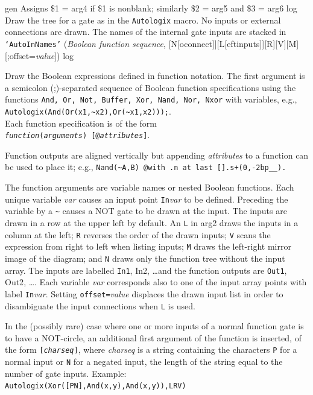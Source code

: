   {gen}%
  {Assigns \$1 = arg4 if \$1 is nonblank; similarly \$2 = arg5 and \$3 = arg6}%
%
  {log}%
  {Draw the tree for a gate as in the {\tt Autologix} macro.  No inputs
   or external connections are drawn.  The names of the internal gate
   inputs are stacked in {\tt `AutoInNames'}}%
%
 {({\sl Boolean function sequence},%
    [N[oconnect]][L[eftinputs]][R][V][M][;offset={\sl value}])}%
  {log}%
  {Draw the Boolean expressions defined in function notation.
   The first argument is a semicolon (;)-separated sequence of
   Boolean function specifications using the functions
   {\tt And, Or, Not, Buffer, Xor, Nand, Nor, Nxor}
   with variables, e.g.,
   {\tt Autologix(And(Or(x1,\~{}x2),Or(\~{}x1,x2)));}.\\
   Each function specification is of the form\\
   {\tt {\sl function}({\sl arguments}) [@{\sl attributes}]}.
   \par
   Function outputs are aligned vertically but appending
   {\tt@}{\sl attributes} to a function can be used to place it; e.g.,
   {\tt Nand(\~{}A,B) @with .n at last [].s+(0,-2bp\_\_).}
   \par
   The function arguments are variable names or nested Boolean functions.
   Each unique variable {\sl var} causes an input point {\tt In}{\sl var}
   to be defined.  Preceding the variable by a {\tt \~{}} causes a NOT gate
   to be drawn at the input.
   The inputs are drawn in a row at the upper left by default.
   An {\tt L} in arg2 draws the inputs in a column at the left;
   {\tt R} reverses the order of the drawn inputs;
   {\tt V} scans the expression from right to left
   when listing inputs;
   {\tt M} draws the left-right mirror image of the diagram;
   and {\tt N} draws only the function tree without the input array.
   The inputs are labelled {\tt In1}, {In2}, \ldots and the function
   outputs are {\tt Out1}, {Out2}, \dots.
   Each variable {\sl var} corresponds also to one of the input array
   points with label {\tt In}{\sl var}.
   Setting {\tt offset=}{\sl value} displaces the
   drawn input list in order to disambiguate the input connections when {\tt L}
   is used.
   \par
   In the (possibly rare) case where one or more inputs of a normal function
   gate is to have a NOT-circle, an additional first argument of the function
   is inserted, of the form {\tt [{\sl charseq}]}, where {\sl charseq}
   is a string containing the characters {\tt P} for a normal input or
   {\tt N} for a negated input, the length of the string equal to the number
   of gate inputs.  Example:
   {\tt Autologix(Xor([PN],And(x,y),And(x,y)),LRV)}}%

